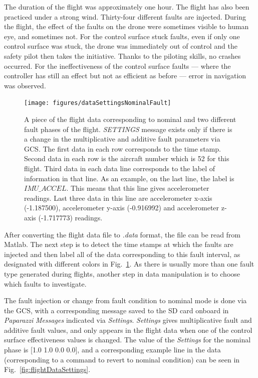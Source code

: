 The duration of the flight was approximately one hour. 
The flight has also been practiced under a strong wind. 
Thirty-four different faults are injected.
During the flight, the effect of the faults on the drone were sometimes visible to human eye, and sometimes not. 
For the control surface stuck faults, even if only one control surface was stuck, the drone was immediately out of control and the safety pilot then takes the initiative. 
Thanks to the piloting skills, no crashes occurred. 
For the ineffectiveness of the control surface faults --- where the controller has still an effect but not as efficient as before --- error in navigation was observed.  

\begin{figure}
\begin{center}
\texttt{[image: figures/dataSettingsNominalFault]}    %
\caption{A piece of the flight data corresponding to nominal and two different fault phases of the flight. \emph{SETTINGS} message exists only if there is a change in the multiplicative and additive fault parameters via GCS. The first data in each row corresponds to the time stamp. Second data in each row is the aircraft number which is 52 for this flight. Third data in each data line corresponds to the label of information in that line. As an example, on the last line, the label is $IMU\_ACCEL$. This means that this line gives accelerometer readings. Last three data in this line are accelerometer x-axis (-1.187500), accelerometer y-axis (-0.916992) and accelerometer z-axis (-1.717773) readings.} 
\label{fig:dataSettingsNominalFault}
\end{center}
\end{figure}


After converting the flight data file to \emph{.data} format, the file can be read from Matlab. The next step is to detect the time stamps at which the faults are injected and then label all of the data corresponding to this fault interval, as designated with different colors in Fig.~\ref{fig:dataSettingsNominalFault}. 
As there is usually more than one fault type generated during flights, another step in data manipulation is to choose which faults to investigate. 

The fault injection or change from fault condition to nominal mode is done via the GCS, with a corresponding message saved to the SD card onboard in \emph{Paparazzi} \emph{Messages} indicated via \emph{Settings}. 
\emph{Settings} gives multiplicative fault and additive fault values, and only appears in the flight data when one of the control surface effectiveness values is changed. 
The value of the \emph{Settings} for the nominal phase is [1.0 1.0 0.0 0.0], and a corresponding example line in the data (corresponding to a command to revert to nominal condition) can be seen in Fig.~\ref{fig:flightDataSettings}. 

